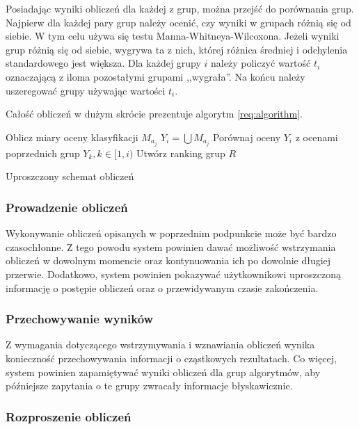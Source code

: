 \documentclass[../thesis.tex]{subfiles}
\begin{document}
Posiadając wyniki obliczeń dla każdej z grup, można przejść do porównania grup. Najpierw dla każdej pary grup należy ocenić, czy wyniki w grupach różnią się od siebie. W tym celu używa się testu Manna-Whitneya-Wilcoxona. Jeżeli wyniki grup różnią się od siebie, wygrywa ta z nich, której różnica średniej i odchylenia standardowego jest większa. Dla każdej grupy $i$ należy policzyć wartość $t_i$ oznaczającą z iloma pozostałymi grupami ,,wygrała''. Na końcu należy uszeregować grupy używając wartości $t_i$.

Całość obliczeń w dużym skrócie prezentuje algorytm \ref{req:algorithm}.

\begin{algorithm}[ht]
   {
     {
      Oblicz miary oceny klasyfikacji $M_{a_j}$\;
    }
    $Y_i = \bigcup M_{a_j}$\;
    Porównaj oceny $Y_i$ z ocenami poprzednich grup $Y_k, k \in [1, i)$\;
  }
  Utwórz ranking grup $R$\;
  \caption{Uproszczony schemat obliczeń}
  \label{req:algorithm}
\end{algorithm}

\subsubsection{Prowadzenie obliczeń}

Wykonywanie obliczeń opisanych w poprzednim podpunkcie może być bardzo czasochłonne. Z tego powodu system powinien dawać możliwość wstrzymania obliczeń w dowolnym momencie oraz kontynuowania ich po dowolnie długiej przerwie. Dodatkowo, system powinien pokazywać użytkownikowi uproszczoną informację o postępie obliczeń oraz o przewidywanym czasie zakończenia.

\subsubsection{Przechowywanie wyników}

Z wymagania dotyczącego wstrzymywania i wznawiania obliczeń wynika konieczność przechowywania informacji o cząstkowych rezultatach. Co więcej, system powinien zapamiętywać wyniki obliczeń dla grup algorytmów, aby późniejsze zapytania o te grupy zwracały informacje błyskawicznie.

\subsubsection{Rozproszenie obliczeń}
\end{document}

